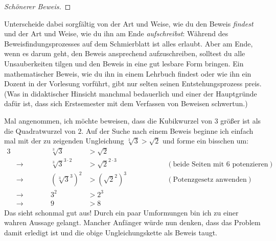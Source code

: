 \begin{bem}[„Gleichungs-U's“]
\begin{proof}[Schönerer Beweis]
    \end{proof}
    Unterscheide dabei sorgfältig von der Art und Weise, wie du den Beweis \emph{findest} und der Art und Weise, wie du ihn am Ende \emph{aufschreibst}: Während des Beweisfindungsprozesses auf dem Schmierblatt ist alles erlaubt. Aber am Ende, wenn es darum geht, den Beweis ansprechend aufzuschreiben, solltest du alle Unsauberkeiten tilgen und den Beweis in eine gut lesbare Form bringen. Ein mathematischer Beweis, wie du ihn in einem Lehrbuch findest oder wie ihn ein Dozent in der Vorlesung vorführt, gibt nur selten seinen Entstehungsprozess preis. (Was in didaktischer Hinsicht manchmal bedauerlich und einer der Hauptgründe dafür ist, dass sich Erstsemester mit dem Verfassen von Beweisen schwertun.)
\end{bem}


\begin{bem} \label{hintennachvorne}
    Mal angenommen, ich möchte beweisen, dass die Kubikwurzel von $3$ größer ist als die Quadratwurzel von $2$. Auf der Suche nach einem Beweis beginne ich einfach mal mit der zu zeigenden Ungleichung $\sqrt[3]{3}>\sqrt{2}$ und forme ein bisschen um:
    \begin{alignat*}{3}
        &\qquad\qquad& \sqrt[3]{3}& >\sqrt{2} \\
        & \to& \sqrt[3]{3}^{3\cdot 2} & > \sqrt{2}^{2\cdot 3} && (\text{beide Seiten mit $6$ potenzieren}) \\
        & \to & (\sqrt[3]{3}^3)^2 & > (\sqrt{2}^2)^3 &\qquad\qquad& (\text{Potenzgesetz anwenden})\\
        & \to & 3^2 & > 2^3 \\
        & \to & 9 & > 8
    \end{alignat*}
    Das sieht schonmal gut aus! Durch ein paar Umformungen bin ich zu einer wahren Aussage gelangt. Mancher Anfänger würde nun denken, dass das Problem damit erledigt ist und die obige Ungleichungskette als Beweis taugt.
    

\end{bem}
